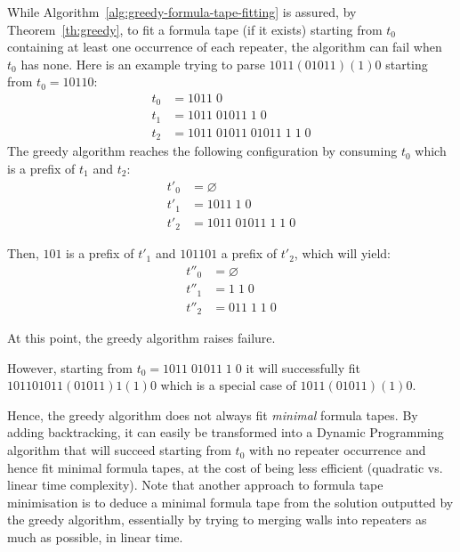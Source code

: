 \begin{remark}
    While Algorithm~\ref{alg:greedy-formula-tape-fitting} is assured, by Theorem~\ref{th:greedy},  to fit a formula tape (if it exists) starting from $t_0$ containing at least one occurrence of each repeater, the algorithm can fail when $t_0$ has none. Here is an example trying to parse $1011(01011)(1)0$ starting from $t_0 = 10110$:
    \begin{align*}
        t_0 & = 1011\; 0                         \\
        t_1 & = 1011\; 01011\; 1\; 0             \\
        t_2 & = 1011\; 01011\; 01011\; 1\; 1\; 0
    \end{align*}
    The greedy algorithm reaches the following configuration by consuming $t_0$ which is a prefix of $t_1$ and $t_2$:
    \begin{align*}
        t'_0 & = \varnothing              \\
        t'_1 & = 1011\; 1\; 0             \\
        t'_2 & = 1011\; 01011\; 1\; 1\; 0
    \end{align*}

    Then, $101$ is a prefix of $t'_1$ and $101 101$ a prefix of $t'_2$, which will yield:
    \begin{align*}
        t''_0 & = \varnothing     \\
        t''_1 & = 1\; 1\; 0       \\
        t''_2 & = 011\; 1\; 1\; 0
    \end{align*}

    At this point, the greedy algorithm raises failure.

    However, starting from $t_0 = 1011\; 01011\; 1\; 0$ it will successfully fit $101101011(01011)1(1)0$ which is a special case of $1011(01011)(1)0$.

    Hence, the greedy algorithm does not always fit \textit{minimal} formula tapes. By adding backtracking, it can easily be transformed into a Dynamic Programming algorithm that will succeed starting from $t_0$ with no repeater occurrence and hence fit minimal formula tapes, at the cost of being less efficient (quadratic vs. linear time complexity).
    Note that another approach to formula tape minimisation is to deduce a minimal formula tape from the solution outputted by the greedy algorithm, essentially by trying to merging walls into repeaters as much as possible, in linear time.

\end{remark}

